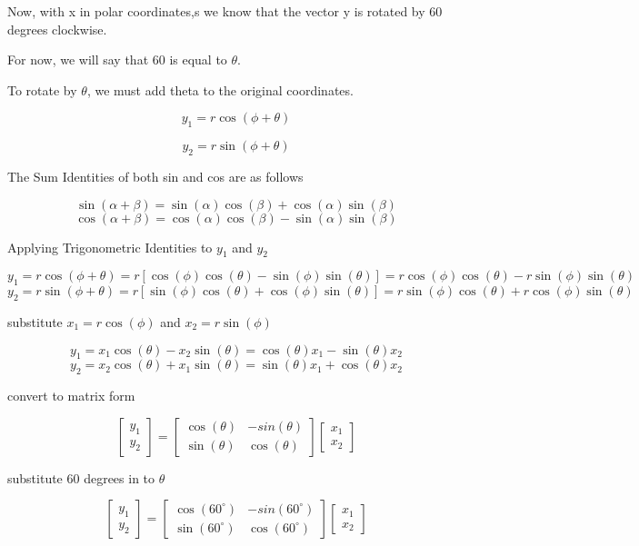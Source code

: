 \begin{enumerate}
\noindent Now, with x in polar coordinates,s we know that the vector y is rotated by 60 degrees clockwise. 

\noindent For now, we will say that 60 is equal to $\theta$. 

\noindent To rotate by $\theta$, we must add theta to the original coordinates.

\[y_1 = r \cos(\phi + \theta)\]

\[y_2 = r \sin(\phi + \theta)\]

\noindent The Sum Identities of both sin and cos are as follows

\[\sin(\alpha + \beta) = \sin(\alpha)\cos(\beta) + \cos(\alpha)\sin(\beta)\]
\[\cos(\alpha + \beta) = \cos(\alpha)\cos(\beta) - \sin(\alpha)\sin(\beta)\]

\noindent Applying Trigonometric Identities to $y_1$ and $y_2$

\[y_1 = r \cos(\phi + \theta) = r[\cos(\phi)\cos(\theta) - \sin(\phi)\sin(\theta)] = r\cos(\phi)\cos(\theta) - r\sin(\phi)\sin(\theta)
\]
\[
y_2 = r \sin(\phi + \theta) = r[\sin(\phi)\cos(\theta) + \cos(\phi)\sin(\theta)] = r\sin(\phi)\cos(\theta) + r\cos(\phi)\sin(\theta)
\]


\noindent substitute $x_1 = r \cos(\phi)$ and $x_2 = r \sin(\phi)$

\[
y_1 = x_1 \cos(\theta) - x_2 \sin(\theta)  = \cos(\theta) x_1 - \sin(\theta)x_2 \]
\[y_2 = x_2 \cos(\theta) + x_1 \sin(\theta) = \sin(\theta) x_1 + \cos(\theta) x_2\]

\noindent convert to matrix form

\[
\begin{bmatrix}
    y_1 \\
    y_2
\end{bmatrix} = 
\begin{bmatrix}
    \cos(\theta) & -sin(\theta) \\
    \sin(\theta) & \cos(\theta)
\end{bmatrix}
\begin{bmatrix}
    x_1 \\
    x_2
\end{bmatrix}
\]

\noindent substitute 60 degrees in to $\theta$

\[
\begin{bmatrix}
    y_1 \\
    y_2
\end{bmatrix} = 
\begin{bmatrix}
    \cos(60^{\circ}) & -sin(60^{\circ}) \\
    \sin(60^{\circ}) & \cos(60^{\circ})
\end{bmatrix}
\begin{bmatrix}
    x_1 \\
    x_2
\end{bmatrix}
\]


\end{enumerate}
